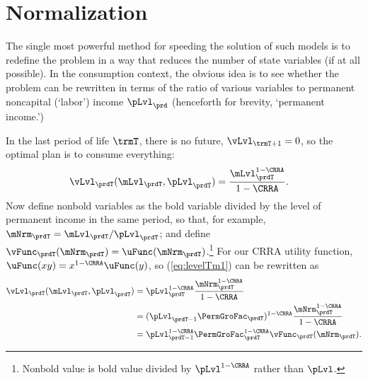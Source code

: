 \documentclass[\econtexRoot/SolvingMicroDSOPs]{subfiles}
\begin{document}
\hypertarget{normalization}{}
\section{Normalization}\label{sec:normalization}

The single most powerful method for speeding the solution of such models is to redefine the problem in a way that reduces the number of state variables (if at all possible).  In the consumption context, the obvious idea is to see whether the problem can be rewritten in terms of the ratio of various variables to permanent noncapital (`labor') income $\pLvl_{\prd}$ (henceforth for brevity, `permanent income.')

In the last {period} of life $\trmT$, there is no future, $\vLvl_{\trmT+1} = 0$, so the optimal plan is to consume everything:
\begin{equation}\begin{gathered}\begin{aligned}
      \vLvl_{\prdT}(\mLvl_{\prdT},\pLvl_{\prdT})  & = \frac{\mLvl_{\prdT}^{1-\CRRA}}{1-\CRRA}. \label{eq:levelTm1}
    \end{aligned}\end{gathered}\end{equation}
Now define nonbold variables as the bold variable divided by the level of permanent income in the same period, so that, for example, ${\mNrm}_{\prdT}=\mLvl_{\prdT}/\pLvl_{\prdT}$; and define $\vFunc_{\prdT}({\mNrm}_{\prdT}) = \uFunc({\mNrm}_{\prdT})$.\footnote{Nonbold value is bold value divided by $\pLvl^{1-\CRRA}$ rather than $\pLvl$.}  For our CRRA utility function, $\uFunc(xy)=x^{1-\CRRA}\uFunc(y)$, so (\ref{eq:levelTm1}) can be rewritten as
\begin{equation}\begin{gathered}\begin{aligned}
      \vLvl_{\prdT}(\mLvl_{\prdT},\pLvl_{\prdT}) & = \pLvl_{\prdT}^{1-\CRRA}\frac{{\mNrm}_{\prdT}^{1-\CRRA}}{1-\CRRA}                       \\
                                                & = (\pLvl_{\prdT-1}\PermGroFac_{\prdT})^{1-\CRRA}\frac{{\mNrm}_{\prdT}^{1-\CRRA}}{1-\CRRA} \\
                                                &= \pLvl_{\prdT-1}^{1-\CRRA}\PermGroFac_{\prdT}^{1-\CRRA}\vFunc_{\prdT}({\mNrm}_{\prdT}). \label{eq:vT}
    \end{aligned}\end{gathered}\end{equation}
\end{document}

